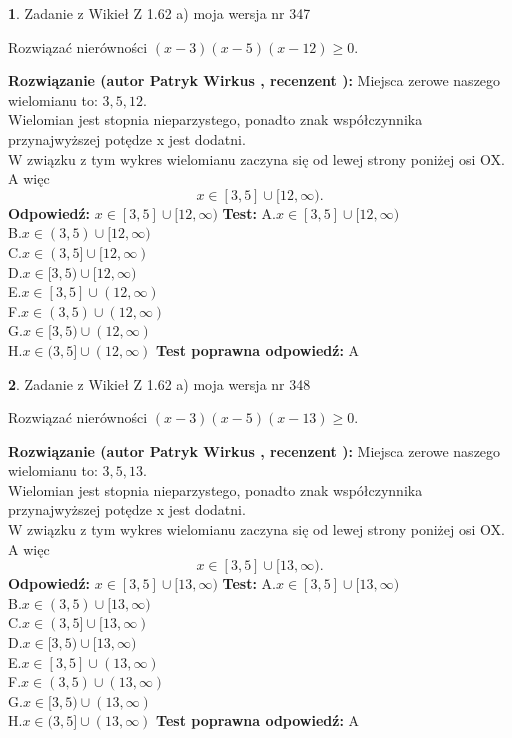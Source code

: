 \documentclass[12pt, a4paper]{article}
\theoremstyle{definition} %
\newtheorem{zad}{}
\newcommand{\zadStart}[1]{\begin{zad}#1\newline}
\newcommand{\zadStop}{\end{zad}}
\newcommand{\rozwStart}[2]{\noindent \textbf{Rozwiązanie (autor #1 , recenzent #2): }\newline}
\newcommand{\rozwStop}{\newline}
\newcommand{\odpStart}{\noindent \textbf{Odpowiedź:}\newline}
\newcommand{\odpStop}{\newline}
\newcommand{\testStart}{\noindent \textbf{Test:}\newline}
\newcommand{\testStop}{\newline}
\newcommand{\kluczStart}{\noindent \textbf{Test poprawna odpowiedź:}\newline}
\newcommand{\kluczStop}{\newline}
\begin{document}
\zadStart{Zadanie z Wikieł Z 1.62 a) moja wersja nr 347}

Rozwiązać nierówności $(x-3)(x-5)(x-12)\ge0$.
\zadStop
\rozwStart{Patryk Wirkus}{}
Miejsca zerowe naszego wielomianu to: $3, 5, 12$.\\
Wielomian jest stopnia nieparzystego, ponadto znak współczynnika przy\linebreak najwyższej potędze x jest dodatni.\\ W związku z tym wykres wielomianu zaczyna się od lewej strony poniżej osi OX. A więc $$x \in [3,5] \cup [12,\infty).$$
\rozwStop
\odpStart
$x \in [3,5] \cup [12,\infty)$
\odpStop
\testStart
A.$x \in [3,5] \cup [12,\infty)$\\
B.$x \in (3,5) \cup [12,\infty)$\\
C.$x \in (3,5] \cup [12,\infty)$\\
D.$x \in [3,5) \cup [12,\infty)$\\
E.$x \in [3,5] \cup (12,\infty)$\\
F.$x \in (3,5) \cup (12,\infty)$\\
G.$x \in [3,5) \cup (12,\infty)$\\
H.$x \in (3,5] \cup (12,\infty)$
\testStop
\kluczStart
A
\kluczStop



\zadStart{Zadanie z Wikieł Z 1.62 a) moja wersja nr 348}

Rozwiązać nierówności $(x-3)(x-5)(x-13)\ge0$.
\zadStop
\rozwStart{Patryk Wirkus}{}
Miejsca zerowe naszego wielomianu to: $3, 5, 13$.\\
Wielomian jest stopnia nieparzystego, ponadto znak współczynnika przy\linebreak najwyższej potędze x jest dodatni.\\ W związku z tym wykres wielomianu zaczyna się od lewej strony poniżej osi OX. A więc $$x \in [3,5] \cup [13,\infty).$$
\rozwStop
\odpStart
$x \in [3,5] \cup [13,\infty)$
\odpStop
\testStart
A.$x \in [3,5] \cup [13,\infty)$\\
B.$x \in (3,5) \cup [13,\infty)$\\
C.$x \in (3,5] \cup [13,\infty)$\\
D.$x \in [3,5) \cup [13,\infty)$\\
E.$x \in [3,5] \cup (13,\infty)$\\
F.$x \in (3,5) \cup (13,\infty)$\\
G.$x \in [3,5) \cup (13,\infty)$\\
H.$x \in (3,5] \cup (13,\infty)$
\testStop
\kluczStart
A
\kluczStop
\end{document}
